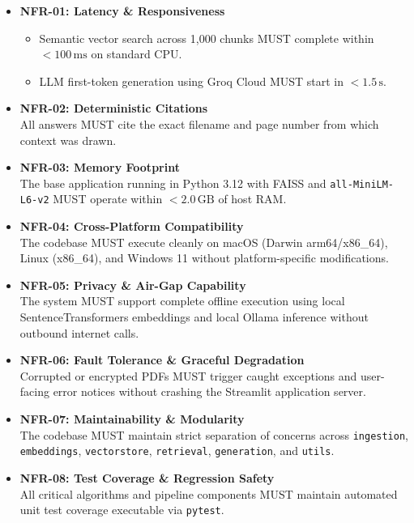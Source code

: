 \documentclass[
]{article}
\providecommand{\tightlist}{%
  \setlength{\itemsep}{0pt}\setlength{\parskip}{0pt}}
\begin{document}
\begin{itemize}
\tightlist
\item
  \textbf{NFR-01: Latency \& Responsiveness}

  \begin{itemize}
  \tightlist
  \item
    Semantic vector search across 1,000 chunks MUST complete within
    \(< 100\,\text{ms}\) on standard CPU.
  \item
    LLM first-token generation using Groq Cloud MUST start in
    \(< 1.5\,\text{s}\).
  \end{itemize}
\item
  \textbf{NFR-02: Deterministic Citations}\\
  All answers MUST cite the exact filename and page number from which
  context was drawn.
\item
  \textbf{NFR-03: Memory Footprint}\\
  The base application running in Python 3.12 with FAISS and
  \texttt{all-MiniLM-L6-v2} MUST operate within \(< 2.0\,\text{GB}\) of
  host RAM.
\item
  \textbf{NFR-04: Cross-Platform Compatibility}\\
  The codebase MUST execute cleanly on macOS (Darwin arm64/x86\_64),
  Linux (x86\_64), and Windows 11 without platform-specific
  modifications.
\item
  \textbf{NFR-05: Privacy \& Air-Gap Capability}\\
  The system MUST support complete offline execution using local
  SentenceTransformers embeddings and local Ollama inference without
  outbound internet calls.
\item
  \textbf{NFR-06: Fault Tolerance \& Graceful Degradation}\\
  Corrupted or encrypted PDFs MUST trigger caught exceptions and
  user-facing error notices without crashing the Streamlit application
  server.
\item
  \textbf{NFR-07: Maintainability \& Modularity}\\
  The codebase MUST maintain strict separation of concerns across
  \texttt{ingestion}, \texttt{embeddings}, \texttt{vectorstore},
  \texttt{retrieval}, \texttt{generation}, and \texttt{utils}.
\item
  \textbf{NFR-08: Test Coverage \& Regression Safety}\\
  All critical algorithms and pipeline components MUST maintain
  automated unit test coverage executable via \texttt{pytest}.
\end{itemize}
\end{document}

